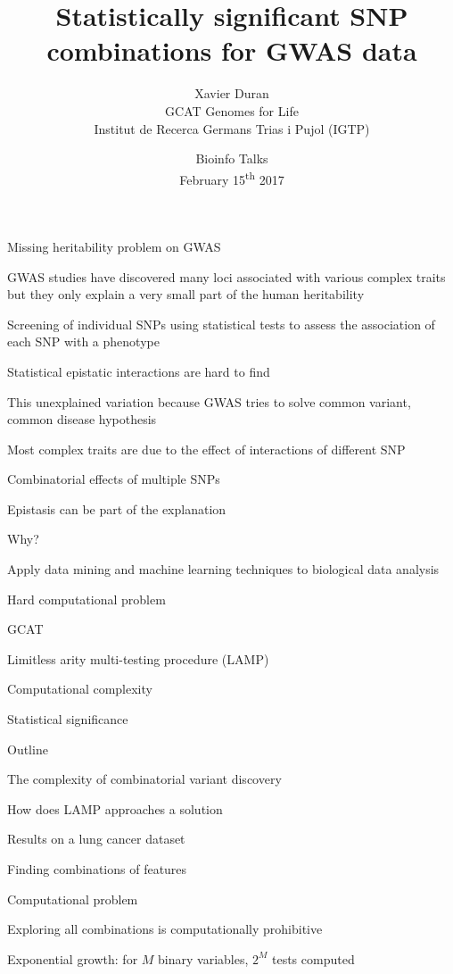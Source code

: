 \documentclass[ignorenonframetext,]{beamer}
\title{Statistically significant SNP combinations for GWAS data}
\author{Xavier Duran\\
GCAT Genomes for Life\\
Institut de Recerca Germans Trias i Pujol (IGTP)}
\date{Bioinfo Talks\\
February 15\textsuperscript{th} 2017}
\begin{document}
\frame{\titlepage}

\begin{frame}{Missing heritability problem on GWAS}

GWAS studies have discovered many loci associated with various complex
traits but they only explain a very small part of the human heritability

Screening of individual SNPs using statistical tests to assess the
association of each SNP with a phenotype

\end{frame}

\begin{frame}{Statistical epistatic interactions are hard to find}

This unexplained variation because GWAS tries to solve common variant,
common disease hypothesis

Most complex traits are due to the effect of interactions of different
SNP

Combinatorial effects of multiple SNPs

Epistasis can be part of the explanation

\end{frame}

\begin{frame}{Why?}

Apply data mining and machine learning techniques to biological data
analysis

Hard computational problem

GCAT

\end{frame}

\begin{frame}{Limitless arity multi-testing procedure (LAMP)}

Computational complexity

Statistical significance

\end{frame}

\begin{frame}{Outline}

The complexity of combinatorial variant discovery

How does LAMP approaches a solution

Results on a lung cancer dataset

\end{frame}

\begin{frame}{Finding combinations of features}

\begin{block}{Computational problem}

Exploring all combinations is computationally prohibitive

Exponential growth: for \(M\) binary variables, \(2^M\) tests computed

\end{block}

\end{frame}
\end{document}

